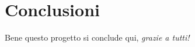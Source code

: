 \documentclass[titlepage]{report}
\begin{document}

	



	

	
	

	

\chapter{Conclusioni}
 	\label{ch:Conclusioni}
	Bene questo progetto si conclude qui, \textit{grazie a tutti!}
	




	
\end{document}
